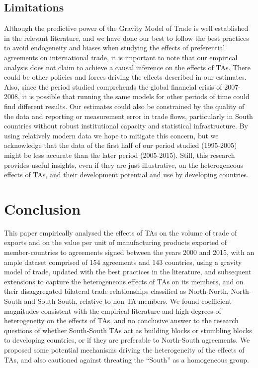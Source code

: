 \documentclass[12pt]{article}%
\begin{document}
\subsection{Limitations}%
\label{subsec:Limitations}%
Although the predictive power of the Gravity Model of Trade is well
established in the relevant literature, and we have done our best to
follow the best practices to avoid endogeneity and biases when studying the effects
of preferential agreements on international trade, it is important to
note that our empirical analysis does not claim to achieve a causal
inference on the effects of TAs. There could be other policies and
forces driving the effects described in our estimates. Also, since the
period studied comprehends the global financial crisis of 2007-2008, it
is possible that running the same models for other periods of time could
find different results. Our estimates could also be constrained by the
quality of the data and reporting or measurement error in trade flows,
particularly in South countries without robust institutional capacity
and statistical infrastructure. By using relatively modern data we hope
to mitigate this concern, but we acknowledge that the data of the first
half of our period studied (1995-2005) might be less accurate than the
later period (2005-2015). Still, this research provides useful insights,
even if they are just illustrative, on the heterogeneous effects of TAs,
and their development potential and use by developing countries.

%
\section{Conclusion}%
\label{sec:Conclusion}%
This paper empirically analysed the effects of TAs on the volume of
trade of exports and on the value per unit of manufacturing products
exported of member-countries to agreements signed between the years 2000
and 2015, with an ample dataset comprised of 154 agreements and 143
countries, using a gravity model of trade, updated with the best
practices in the literature, and subsequent extensions to capture the
heterogeneous effects of TAs on its members, and on their disaggregated
bilateral trade relationships classified as North-North, North-South and
South-South, relative to non-TA-members. We found coefficient magnitudes
consistent with the empirical literature and high degrees of
heterogeneity on the effects of TAs, and no conclusive answer to the
research questions of whether South-South TAs act as building blocks or
stumbling blocks to developing countries, or if they are preferable to
North-South agreements. We proposed some potential mechanisms driving
the heterogeneity of the effects of TAs, and also cautioned against
threating the ``South'' as a homogeneous group.
\end{document}

